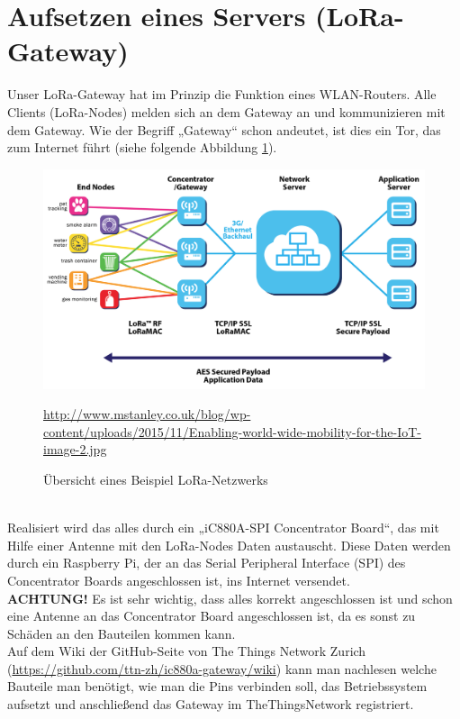 \section{Aufsetzen eines Servers (LoRa-Gateway)}
Unser LoRa-Gateway hat im Prinzip die Funktion eines WLAN-Routers. Alle Clients (LoRa-Nodes) melden sich an dem Gateway an und kommunizieren mit dem Gateway. Wie der Begriff „Gateway“ schon andeutet, ist dies ein Tor, das zum Internet führt (siehe folgende Abbildung \ref{fig:lora-schaubild}).
\begin{figure}[ht]
    \center
    \includegraphics[width=15cm]{Bilder/lora-schaubild.jpg}\\
    \caption{Übersicht eines Beispiel LoRa-Netzwerks}
    \begin{center} \quelle\url{http://www.mstanley.co.uk/blog/wp-content/uploads/2015/11/Enabling-world-wide-mobility-for-the-IoT-image-2.jpg} \end{center}
    \label{fig:lora-schaubild}
\end{figure}\\
Realisiert wird das alles durch ein „iC880A-SPI Concentrator Board“, das mit Hilfe einer Antenne mit den LoRa-Nodes Daten austauscht. Diese Daten werden durch ein Raspberry Pi, der an das Serial Peripheral Interface (SPI) des Concentrator Boards angeschlossen ist, ins Internet versendet.\\
\textbf{ACHTUNG!} Es ist sehr wichtig, dass alles korrekt angeschlossen ist und schon eine Antenne an das Concentrator Board angeschlossen ist, da es sonst zu Schäden an den Bauteilen kommen kann. \\
Auf dem Wiki der GitHub-Seite von The Things Network Zurich (\url{https://github.com/ttn-zh/ic880a-gateway/wiki}) kann man nachlesen welche Bauteile man benötigt, wie man die Pins verbinden soll, das Betriebssystem aufsetzt und anschließend das Gateway im TheThingsNetwork registriert.\\
